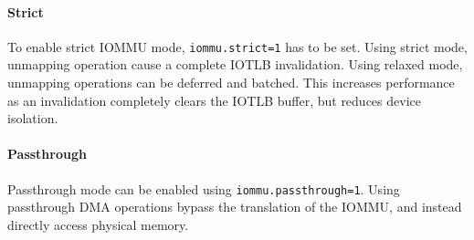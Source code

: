 \paragraph{Strict}
To enable strict IOMMU mode, \texttt{iommu.strict=1} has to be set. Using strict mode, unmapping operation cause a complete IOTLB invalidation. Using relaxed mode, unmapping operations can be deferred and batched. This increases performance as an invalidation completely clears the IOTLB buffer, but reduces device isolation.

\paragraph{Passthrough}
Passthrough mode can be enabled using \texttt{iommu.passthrough=1}. Using passthrough DMA operations bypass the translation of the IOMMU, and instead directly access physical memory.